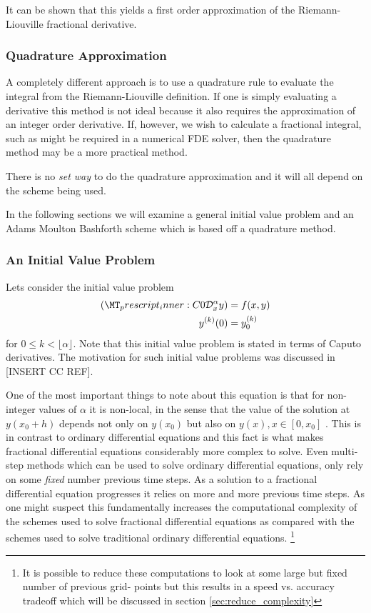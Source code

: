 It can be shown \cite{Podlubny1999} that this yields a first order approximation of the Riemann-Liouville fractional derivative.
\subsubsection{Quadrature Approximation}
A completely different approach is to use a quadrature rule to evaluate the integral from the Riemann-Liouville definition. If one is simply evaluating a derivative this method is not ideal because it also requires the approximation of an integer order derivative. If, however, we wish to calculate a fractional integral, such as might be required in a numerical FDE solver, then the quadrature method may be a more practical method.

There is no \emph{set way} to do the quadrature approximation and it will all depend on the scheme being used. 

In the following sections we will examine a general initial value problem and an Adams Moulton Bashforth scheme which is based off a quadrature method. \cite{Diethelm2011}

\subsubsection{An Initial Value Problem}
Lets consider the initial value problem
\begin{align}
    \label{eq:num_ivp_1}
    \capder{0}{x}{\alpha}{y} &= f(x,y) \\
    \label{eq:num_ivp_2}
    y^{(k)}(0) &= y_{0}^{(k)} 
\end{align}
for $ 0 \leq k < \lfloor \alpha \rfloor $. Note that this initial value problem is stated in terms of Caputo derivatives. The motivation for such initial value problems was discussed in [INSERT CC REF].

One of the most important things to note about this equation is that for non-integer values of $ \alpha $ it is non-local, in the sense that the value of the solution at $ y(x_0+h) $ depends not only on $ y(x_0) $ but also on $ y(x), x \in [0, x_0] $ \cite{Diethelm2010}. This is in contrast to ordinary differential equations and this fact is what makes fractional differential equations considerably more complex to solve. Even multi-step methods which can be used to solve ordinary differential equations, only rely on some \emph{fixed} number previous time steps. As a solution to a fractional differential equation progresses it relies on more and more previous time steps. As one might suspect this fundamentally increases the computational complexity of the schemes used to solve fractional differential equations as compared with the schemes used to solve traditional ordinary differential equations. \footnote{It is possible to reduce these computations to look at some large but fixed number of previous grid-
points 
but this results in a speed vs. accuracy tradeoff which will be discussed in section \ref{sec:reduce_complexity}}

